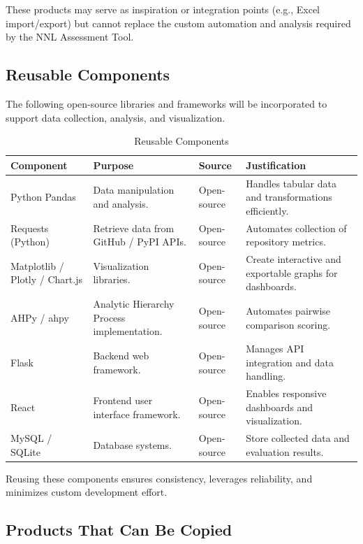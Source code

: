 \documentclass[12pt]{article}
\begin{document}
These products may serve as inspiration or integration points (e.g., Excel import/export) but cannot replace the custom automation and analysis required by the NNL Assessment Tool.

\subsection{Reusable Components}

The following open-source libraries and frameworks will be incorporated to support data collection, analysis, and visualization.

\begin{table}[H]
\caption{Reusable Components}
\centering
\begin{tabularx}{\textwidth}{|p{2.5cm}|X|X|X|}
\hline
\textbf{Component} & \textbf{Purpose} & \textbf{Source} & \textbf{Justification} \\ \hline
Python Pandas & Data manipulation and analysis. & Open-source & Handles tabular data and transformations efficiently. \\ \hline
Requests (Python) & Retrieve data from GitHub / PyPI APIs. & Open-source & Automates collection of repository metrics. \\ \hline
Matplotlib / Plotly / Chart.js & Visualization libraries. & Open-source & Create interactive and exportable graphs for dashboards. \\ \hline
AHPy / ahpy & Analytic Hierarchy Process implementation. & Open-source & Automates pairwise comparison scoring. \\ \hline
Flask & Backend web framework. & Open-source & Manages API integration and data handling. \\ \hline
React & Frontend user interface framework. & Open-source & Enables responsive dashboards and visualization. \\ \hline
MySQL / SQLite & Database systems. & Open-source & Store collected data and evaluation results. \\ \hline
\end{tabularx}
\end{table}

Reusing these components ensures consistency, leverages reliability, and minimizes custom development effort.

\subsection{Products That Can Be Copied}
\end{document}
